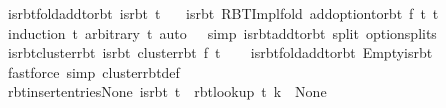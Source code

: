 \begin{isabellebody}
\endisatagproof
{\isafoldproof}%
%
\isadelimproof
\isanewline
%
\endisadelimproof
\isanewline
{}\isamarkupfalse%
\ is{\isacharunderscore}{\kern0pt}rbt{\isacharunderscore}{\kern0pt}fold{\isacharunderscore}{\kern0pt}add{\isacharunderscore}{\kern0pt}to{\isacharunderscore}{\kern0pt}rbt{\isacharcolon}{\kern0pt}\ {\isachardoublequoteopen}is{\isacharunderscore}{\kern0pt}rbt\ t{\isacharprime}{\kern0pt}\ {\isasymLongrightarrow}\isanewline
\ \ is{\isacharunderscore}{\kern0pt}rbt\ {\isacharparenleft}{\kern0pt}RBT{\isacharunderscore}{\kern0pt}Impl{\isachardot}{\kern0pt}fold\ {\isacharparenleft}{\kern0pt}add{\isacharunderscore}{\kern0pt}option{\isacharunderscore}{\kern0pt}to{\isacharunderscore}{\kern0pt}rbt\ f{\isacharparenright}{\kern0pt}\ t\ t{\isacharprime}{\kern0pt}{\isacharparenright}{\kern0pt}{\isachardoublequoteclose}\isanewline
%
\isadelimproof
\ \ %
\endisadelimproof
%
\isatagproof
{}\isamarkupfalse%
\ {\isacharparenleft}{\kern0pt}induction\ t\ arbitrary{\isacharcolon}{\kern0pt}\ t{\isacharprime}{\kern0pt}{\isacharparenright}{\kern0pt}\ {\isacharparenleft}{\kern0pt}auto\ {}\ {}\ simp{\isacharcolon}{\kern0pt}\ is{\isacharunderscore}{\kern0pt}rbt{\isacharunderscore}{\kern0pt}add{\isacharunderscore}{\kern0pt}to{\isacharunderscore}{\kern0pt}rbt\ split{\isacharcolon}{\kern0pt}\ option{\isachardot}{\kern0pt}splits{\isacharparenright}{\kern0pt}%
\endisatagproof
{\isafoldproof}%
%
\isadelimproof
\isanewline
%
\endisadelimproof
\isanewline
{}\isamarkupfalse%
\ is{\isacharunderscore}{\kern0pt}rbt{\isacharunderscore}{\kern0pt}cluster{\isacharunderscore}{\kern0pt}rbt{\isacharcolon}{\kern0pt}\ {\isachardoublequoteopen}is{\isacharunderscore}{\kern0pt}rbt\ {\isacharparenleft}{\kern0pt}cluster{\isacharunderscore}{\kern0pt}rbt\ f\ t{\isacharparenright}{\kern0pt}{\isachardoublequoteclose}\isanewline
%
\isadelimproof
\ \ %
\endisadelimproof
%
\isatagproof
{}\isamarkupfalse%
\ is{\isacharunderscore}{\kern0pt}rbt{\isacharunderscore}{\kern0pt}fold{\isacharunderscore}{\kern0pt}add{\isacharunderscore}{\kern0pt}to{\isacharunderscore}{\kern0pt}rbt\ Empty{\isacharunderscore}{\kern0pt}is{\isacharunderscore}{\kern0pt}rbt\isanewline
\ \ \isamarkupfalse%
\ {\isacharparenleft}{\kern0pt}fastforce\ simp{\isacharcolon}{\kern0pt}\ cluster{\isacharunderscore}{\kern0pt}rbt{\isacharunderscore}{\kern0pt}def{\isacharparenright}{\kern0pt}%
\endisatagproof
{\isafoldproof}%
%
\isadelimproof
\isanewline
%
\endisadelimproof
\isanewline
{}\isamarkupfalse%
\ rbt{\isacharunderscore}{\kern0pt}insert{\isacharunderscore}{\kern0pt}entries{\isacharunderscore}{\kern0pt}None{\isacharcolon}{\kern0pt}\ {\isachardoublequoteopen}is{\isacharunderscore}{\kern0pt}rbt\ t\ {\isasymLongrightarrow}\ rbt{\isacharunderscore}{\kern0pt}lookup\ t\ k\ {\isacharequal}{\kern0pt}\ None\ {\isasymLongrightarrow}\isanewline

\end{isabellebody}

